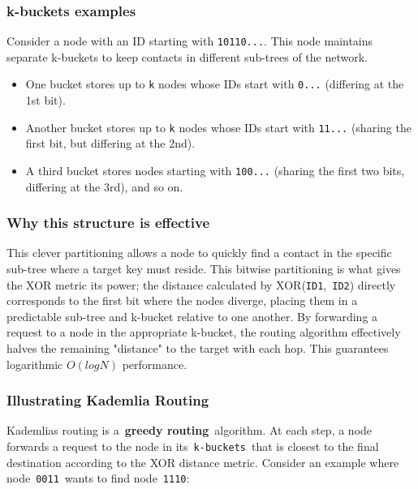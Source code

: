\documentclass{scrbook}
\begin{document}
\subsubsection{k-buckets examples}
Consider a node with an ID starting with
  \texttt{10110...}. This node maintains separate k-buckets to keep
  contacts in different sub-trees of the network.
  \begin{itemize}
      \item
      One bucket stores up to \texttt{k} nodes whose IDs start
      with \texttt{0...} (differing at the 1st bit).

      \item
      Another bucket stores up to \texttt{k} nodes whose IDs start with \texttt{11...} (sharing the first bit, but differing at the
      2nd).

      \item
      A third bucket stores nodes starting with \texttt{100...} (sharing
      the first two bits, differing at the 3rd), and so on.
  \end{itemize}

\subsubsection{Why this structure is effective} This clever partitioning allows a node to quickly find a contact in the specific sub-tree where
  a target key must reside. This bitwise partitioning is what gives the
  XOR metric its power; the \textquotesingle distance\textquotesingle{}
  calculated by XOR(\texttt{ID1},~\texttt{ID2}) directly corresponds to
  the first bit where the nodes diverge, placing them in a predictable
  sub-tree and k-bucket relative to one another. By forwarding a request
  to a node in the appropriate k-bucket, the routing algorithm
  effectively halves the remaining "distance" to the target with each
  hop. This guarantees logarithmic $O(log N)$ performance.

\subsubsection{Illustrating Kademlia Routing} Kademlia\textquotesingle s
  routing is a~\textbf{greedy routing}~algorithm. At each step, a node
  forwards a request to the node in its~\texttt{k-buckets}~that is
  closest to the final destination according to the XOR distance metric.
  Consider an example where node~\texttt{0011}~wants to find
  node~\texttt{1110}:
\end{document}
